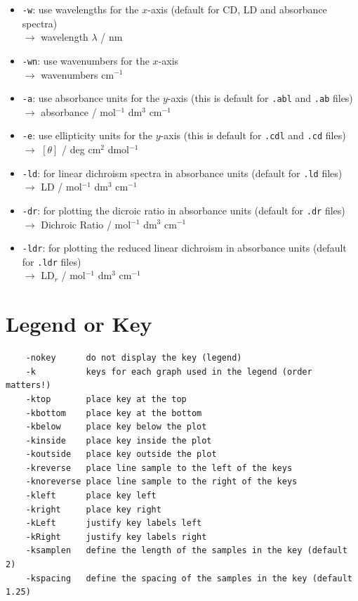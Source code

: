 \documentclass[12pt, a4paper]{article}
\begin{document}
\begin{itemize}
\item \verb'-w': use wavelengths for the $x$-axis (default for CD, LD and absorbance spectra)\\
$\rightarrow$ wavelength $\lambda$ / nm

\item \verb'-wn': use wavenumbers for the $x$-axis\\
$\rightarrow$ wavenumbers cm$^{-1}$

\item \verb'-a': use absorbance units for the $y$-axis (this is default for \verb'.abl' and \verb'.ab' files)\\
$\rightarrow$ absorbance / mol$^{-1}$ dm$^3$ cm$^{-1}$

\item \verb'-e': use ellipticity units for the $y$-axis (this is default for \verb'.cdl' and \verb'.cd' files)\\
$\rightarrow$ $[\theta]$ / deg cm$^2$ dmol$^{-1}$

\item \verb'-ld': for linear dichroism spectra in absorbance units (default for \verb'.ld' files)\\
$\rightarrow$ LD / mol$^{-1}$ dm$^3$ cm$^{-1}$

\item \verb'-dr': for plotting the dicroic ratio in absorbance units (default for \verb'.dr' files)\\
$\rightarrow$ Dichroic Ratio / mol$^{-1}$ dm$^3$ cm$^{-1}$

\item \verb'-ldr': for plotting the reduced linear dichroism in absorbance units (default for \verb'.ldr' files)\\
$\rightarrow$ LD$_{r}$ / mol$^{-1}$ dm$^3$ cm$^{-1}$
\end{itemize}





\section{Legend or Key}

\begin{verbatim}
    -nokey      do not display the key (legend)
    -k          keys for each graph used in the legend (order matters!)
    -ktop       place key at the top
    -kbottom    place key at the bottom
    -kbelow     place key below the plot
    -kinside    place key inside the plot
    -koutside   place key outside the plot
    -kreverse   place line sample to the left of the keys
    -knoreverse place line sample to the right of the keys
    -kleft      place key left
    -kright     place key right
    -kLeft      justify key labels left
    -kRight     justify key labels right
    -ksamplen   define the length of the samples in the key (default 2)
    -kspacing   define the spacing of the samples in the key (default 1.25)
\end{verbatim}
\end{document}
